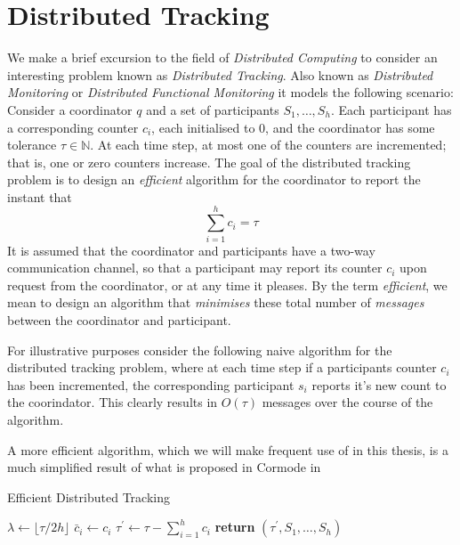 \section{Distributed Tracking}
\label{sec:dist-tracking}

We make a brief excursion to the field of \textit{Distributed Computing} to consider an interesting problem known as \textit{Distributed Tracking}. Also known as \textit{Distributed Monitoring} or \textit{Distributed Functional Monitoring} it models the following scenario: Consider a coordinator $q$ and a set of participants $S_1, \dots, S_h$. Each participant has a corresponding counter $c_i$, each initialised to 0, and the coordinator has some tolerance $\tau \in \mathbb{N}$. At each time step, at most one of the counters are incremented; that is, one or zero counters increase. The goal of the distributed tracking problem is to design an \textit{efficient} algorithm for the coordinator to report the instant that 
$$\sum_{i=1}^{h}c_i = \tau$$
It is assumed that the coordinator and participants have a two-way communication channel, so that a participant may report its counter $c_i$ upon request from the coordinator, or at any time it pleases. By the term \textit{efficient}, we mean to design an algorithm that \textit{minimises} these total number of \textit{messages} between the coordinator and participant.

For illustrative purposes consider the following naive algorithm for the distributed tracking problem, where at each time step if a participants counter $c_i$ has been incremented, the corresponding participant $s_i$ reports it's new count to the coorindator. This clearly results in $O(\tau)$ messages over the course of the algorithm.

A more efficient algorithm, which we will make frequent use of in this thesis, is a much simplified result of what is proposed in Cormode in \cite{Cormode2011}
\begin{algorithm}
\caption{Efficient Distributed Tracking}\label{alg:dist-tracking}
\begin{algorithmic}[1]
    \State {}
\EndIf
\State {} $\lambda \leftarrow \lfloor \tau/2h\rfloor$
\State {}
\State {}
\State $\bar{c}_i \gets c_i$
\EndIf
\State {} $\tau^\prime\leftarrow\tau-\sum_{i=1}^{h}c_i$
\EndFor
\State \textbf{return} $(\tau^\prime, S_1,\dots,S_h)$ 
\EndProcedure
\end{algorithmic}
\end{algorithm}

